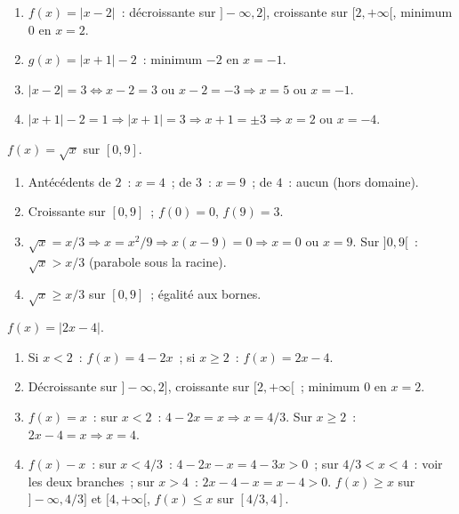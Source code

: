 
\begin{enumerate}
  \item $f(x)=|x-2|$~: d\'ecroissante sur $]-\infty,2]$, croissante sur $[2,+\infty[$, minimum $0$ en $x=2$.
  \item $g(x)=|x+1|-2$~: minimum $-2$ en $x=-1$.
  \item $|x-2|=3\Leftrightarrow x-2=3$ ou $x-2=-3\Rightarrow x=5$ ou $x=-1$.
  \item $|x+1|-2=1\Rightarrow|x+1|=3\Rightarrow x+1=\pm3\Rightarrow x=2$ ou $x=-4$.
\end{enumerate}


$f(x)=\sqrt{x}$ sur $[0,9]$.
\begin{enumerate}
  \item Ant\'ec\'edents de $2$~: $x=4$~; de $3$~: $x=9$~; de $4$~: aucun (hors domaine).
  \item Croissante sur $[0,9]$~; $f(0)=0$, $f(9)=3$.
  \item $\sqrt{x}=x/3\Rightarrow x=x^2/9\Rightarrow x(x-9)=0\Rightarrow x=0$ ou $x=9$.
        Sur $]0,9[$~: $\sqrt{x}>x/3$ (parabole sous la racine).
  \item $\sqrt{x}\geq x/3$ sur $[0,9]$~; \'egalit\'e aux bornes.
\end{enumerate}


$f(x)=|2x-4|$.
\begin{enumerate}
  \item Si $x<2$~: $f(x)=4-2x$~; si $x\geq2$~: $f(x)=2x-4$.
  \item D\'ecroissante sur $]-\infty,2]$, croissante sur $[2,+\infty[$~; minimum $0$ en $x=2$.
  \item $f(x)=x$~: sur $x<2$~: $4-2x=x\Rightarrow x=4/3$.\checkmark\quad
        Sur $x\geq2$~: $2x-4=x\Rightarrow x=4$.\checkmark
  \item $f(x)-x$~: sur $x<4/3$~: $4-2x-x=4-3x>0$~;
        sur $4/3<x<4$~: voir les deux branches~;
        sur $x>4$~: $2x-4-x=x-4>0$.
        $f(x)\geq x$ sur $]-\infty,4/3]$ et $[4,+\infty[$, $f(x)\leq x$ sur $[4/3,4]$.
\end{enumerate}


